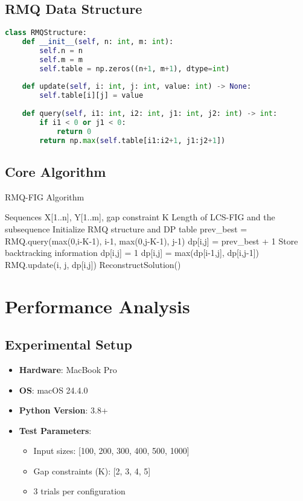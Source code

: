\documentclass{article}
\begin{document}
\subsection{RMQ Data Structure}
\begin{lstlisting}[language=Python]
class RMQStructure:
    def __init__(self, n: int, m: int):
        self.n = n
        self.m = m
        self.table = np.zeros((n+1, m+1), dtype=int)
        
    def update(self, i: int, j: int, value: int) -> None:
        self.table[i][j] = value
        
    def query(self, i1: int, i2: int, j1: int, j2: int) -> int:
        if i1 < 0 or j1 < 0:
            return 0
        return np.max(self.table[i1:i2+1, j1:j2+1])
\end{lstlisting}

\subsection{Core Algorithm}
\begin{algorithm}
\caption{RMQ-FIG Algorithm}
\begin{algorithmic}[1]
\REQUIRE Sequences X[1..n], Y[1..m], gap constraint K
\ENSURE Length of LCS-FIG and the subsequence
\STATE Initialize RMQ structure and DP table
            \STATE prev\_best = RMQ.query(max(0,i-K-1), i-1, max(0,j-K-1), j-1)
                \STATE dp[i,j] = prev\_best + 1
                \STATE Store backtracking information
            \ELSE
                \STATE dp[i,j] = 1
            \ENDIF
        \ELSE
            \STATE dp[i,j] = max(dp[i-1,j], dp[i,j-1])
        \ENDIF
        \STATE RMQ.update(i, j, dp[i,j])
    \ENDFOR
\ENDFOR
\RETURN ReconstructSolution()
\end{algorithmic}
\end{algorithm}

\section{Performance Analysis}

\subsection{Experimental Setup}
\begin{itemize}
    \item \textbf{Hardware}: MacBook Pro
    \item \textbf{OS}: macOS 24.4.0
    \item \textbf{Python Version}: 3.8+
    \item \textbf{Test Parameters}:
    \begin{itemize}
        \item Input sizes: [100, 200, 300, 400, 500, 1000]
        \item Gap constraints (K): [2, 3, 4, 5]
        \item 3 trials per configuration
    \end{itemize}
\end{itemize}
\end{document}
